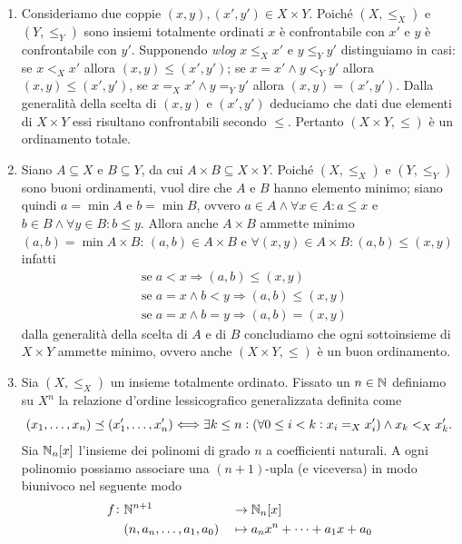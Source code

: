 \documentclass[a4paper]{article}\par \usepackage{style}\par
\begin{document}
\begin{enumerate}
\item Consideriamo due coppie $ (x, y), (x', y') \in X \times Y $. Poiché $ (X, \leq_X) $ e $ (Y, \leq_Y) $ sono insiemi totalmente ordinati $ x $ è confrontabile con $ x' $ e $ y $ è confrontabile con $ y' $. Supponendo \emph{wlog} $ x \leq_X x' $ e $ y \leq_Y y' $ distinguiamo in casi: se $ x <_X x' $ allora $ (x, y) \leq (x', y') $; se $ x = x' \wedge y <_Y y' $ allora $ (x, y) \leq (x', y') $, se $ x =_X x' \wedge y =_Y y' $ allora $ (x, y) = (x', y') $. Dalla generalità della scelta di $ (x, y) $ e $ (x', y') $ deduciamo che dati due elementi di $ X \times Y $ essi risultano confrontabili secondo $ \leq $. Pertanto $ (X \times Y, \leq) $ è un ordinamento totale.
\item Siano $ A \subseteq X $ e $ B \subseteq Y $, da cui $ A \times B \subseteq X \times Y $. Poiché $ (X, \leq_X) $ e $ (Y, \leq_Y) $ sono buoni ordinamenti, vuol dire che $ A $ e $ B $ hanno elemento minimo; siano quindi $ a = \min A $ e $ b = \min B $, ovvero $ a \in A \wedge \forall x \in A : a \leq x $ e $ b \in B \wedge \forall y \in B : b \leq y $. Allora anche $ A \times B $ ammette minimo $ (a, b) = \min A \times B $: $ (a, b) \in A \times B $ e $ \forall (x, y) \in A \times B : (a, b) \leq (x, y) $ infatti
  \begin{align*}
    & \text{se} \; a < x \Rightarrow (a, b) \leq (x, y) \\
    & \text{se} \; a = x \wedge b < y \Rightarrow (a, b) \leq (x, y) \\
    & \text{se} \; a= x \wedge b = y \Rightarrow (a, b) = (x, y)
  \end{align*}
  dalla generalità della scelta di $ A $ e di $ B $ concludiamo che ogni sottoinsieme di $ X \times Y $ ammette minimo, ovvero anche $ (X \times Y, \leq) $ è un buon ordinamento.
\item Sia $ (X, \leq_X) $ un insieme totalmente ordinato. Fissato un $ n \in \mathbb{N} $ definiamo su $ X^n $ la relazione d'ordine lessicografico generalizzata definita come
  \[(x_1, \dots, x_n) \preceq (x_1', \dots, x_n') \Longleftrightarrow \exists k \leq n : (\forall 0 \leq i < k : x_i =_X x_i') \wedge x_k <_X x_k'.\]
  Sia $ \mathbb{N}_n[x] $ l'insieme dei polinomi di grado $ n $ a coefficienti naturali. A ogni polinomio possiamo associare una $ (n + 1) $-upla (e viceversa) in modo biunivoco nel seguente modo
  \begin{alignat*}{3}
    f \colon & \N^{n+1} && \to \N_n[x] \\
    & (n, a_n, \dots, a_1, a_0)  && \mapsto a_n x^n + \dots + a_1 x + a_0

\end{alignat*}
\end{enumerate}
\end{document}
